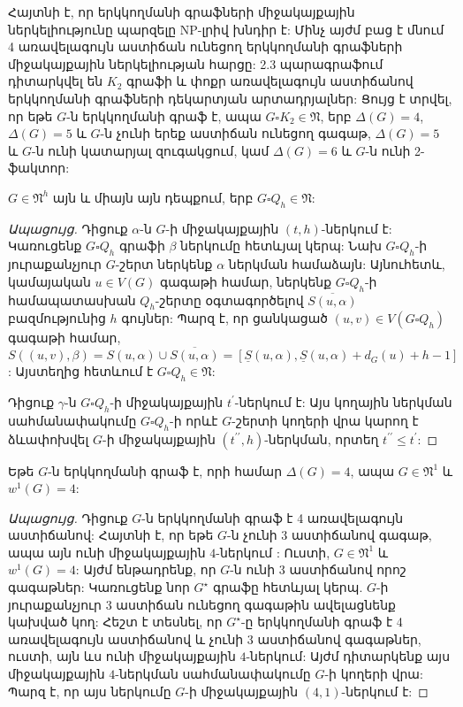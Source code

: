 Հայտնի է, որ երկկողմանի գրաֆների միջակայքային ներկելիությունը պարզելը NP-լրիվ խնդիր է: Մինչ այժմ բաց է մնում 4 առավելագույն աստիճան ունեցող երկկողմանի գրաֆների միջակայքային ներկելիության հարցը: 2.3 պարագրաֆում դիտարկվել են $K_2$ գրաֆի և փոքր առավելագույն աստիճանով երկկողմանի գրաֆների դեկարտյան արտադրյալներ: Ցույց է տրվել, որ եթե $G$-ն երկկողմանի գրաֆ է, ապա $G \square K_2 \in \mathfrak{N}$, երբ $\Delta(G)=4$, $\Delta(G)=5$ և $G$-ն չունի երեք աստիճան ունեցող գագաթ, $\Delta(G)=5$ և $G$-ն ունի կատարյալ զուգակցում, կամ $\Delta(G)=6$ և $G$-ն ունի 2-ֆակտոր:

\begin{hide}
\begin{theorem}
\label{t2_cartesian_gap} $G\in \mathfrak{N}^{h}$ այն և միայն այն դեպքում, երբ $G\square
Q_{h}\in \mathfrak{N}$:
\end{theorem}
\begin{proof}[Ապացույց]
Դիցուք $\alpha$-ն $G$-ի միջակայքային $(t,h)$-ներկում է: Կառուցենք $G\square Q_{h}$ գրաֆի $\beta$ ներկումը հետևյալ կերպ: Նախ $G\square Q_{h}$-ի յուրաքանչյուր $G$-շերտ ներկենք $\alpha$ ներկման համաձայն: Այնուհետև, կամայական $u\in V(G)$ գագաթի համար, ներկենք $G\square Q_{h}$-ի համապատասխան $Q_{h}$-շերտը օգտագործելով $\overline
{S\left(u,\alpha \right)}$ բազմությունից $h$ գույներ: Պարզ է, որ ցանկացած $(u,v)\in V(G\square
Q_{h})$ գագաթի համար, $S\left((u,v),\beta \right)=S\left(u,\alpha \right)\cup
\overline{S\left(u,\alpha \right)}=\left[\underline S\left(u,\alpha
\right),\underline S\left(u,\alpha \right)+d_{G}(u)+h-1\right]$:
Այստեղից հետևում է $G\square Q_{h}\in \mathfrak{N}$:

Դիցուք $\gamma$-ն $G\square
Q_{h}$-ի միջակայքային $t^{\prime}$-ներկում է: Այս կողային ներկման սահմանափակումը $G\square Q_{h}$-ի որևէ $G$-շերտի կողերի վրա կարող է ձևափոխվել $G$-ի
միջակայքային $(t^{\prime\prime},h)$-ներկման, որտեղ $t^{\prime\prime}\leq
t^{\prime}$:
\end{proof} %

\begin{theorem}
\label{t2_bipartite_Delta4} Եթե $G$-ն երկկողմանի գրաֆ է, որի համար $\Delta(G)=4$,
ապա $G\in \mathfrak{N}^{1}$ և $w^{1}(G)=4$:
\end{theorem}
\begin{proof}[Ապացույց] Դիցուք $G$-ն երկկողմանի գրաֆ է 4 առավելագույն աստիճանով:
Հայտնի է, որ եթե $G$-ն չունի 3 աստիճանով գագաթ, ապա այն ունի միջակայքային $4$-ներկում \cite{Giaro1997}: Ուստի, $G\in
\mathfrak{N}^{1}$ և $w^{1}(G)=4$: Այժմ ենթադրենք, որ $G$-ն ունի 3 աստիճանով որոշ գագաթներ: Կառուցենք նոր $G^{\star}$ գրաֆը հետևյալ կերպ. $G$-ի յուրաքանչյուր $3$ աստիճան ունեցող գագաթին ավելացնենք կախված կող: Հեշտ է տեսնել, որ $G^{\star}$-ը երկկողմանի գրաֆ է 4 առավելագույն աստիճանով և չունի 3 աստիճանով գագաթներ, ուստի, այն ևս ունի միջակայքային $4$-ներկում: Այժմ դիտարկենք այս միջակայքային $4$-ներկման սահմանափակումը $G$-ի կողերի վրա: Պարզ է, որ այս ներկումը $G$-ի միջակայքային $(4,1)$-ներկում է:
\end{proof}


\end{hide}
